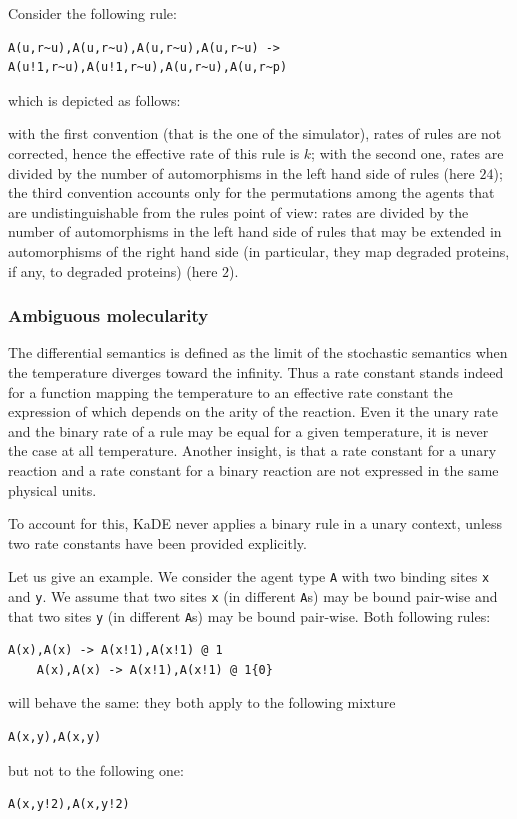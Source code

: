 \documentclass[11pt]{book}
\def\KaDE{\textsf{KaDE}}
\begin{document}
  Consider the following rule:
    \begin{lstlisting}[language=kappa]
      A(u,r~u),A(u,r~u),A(u,r~u),A(u,r~u) -> A(u!1,r~u),A(u!1,r~u),A(u,r~u),A(u,r~p)
    \end{lstlisting}
which is depicted as follows:
\begin{center}
\end{center}

  with the first convention (that is the one of the simulator), rates of rules are not corrected, hence the effective rate of this rule is $k$;
  with the second one, rates are divided by the number of automorphisms in the left hand side of rules (here $24$); the third convention accounts only for the permutations among the agents that are undistinguishable from the rules point of view: rates are divided by the number of automorphisms in the left hand side of rules that may be extended in automorphisms of the right hand side (in particular, they map degraded proteins, if any, to degraded proteins) (here $2$).

  \subsubsection{Ambiguous molecularity}

The differential semantics is defined as the limit of the stochastic semantics when the temperature diverges toward the infinity. Thus a rate constant stands indeed for a function mapping the temperature to an effective rate constant the expression of which depends on the arity of the reaction. Even it the unary rate and the binary rate of a rule may be equal for a given temperature, it is never the case at all temperature. Another insight, is that a rate constant for a unary reaction and a rate constant for a binary reaction are not expressed in the same physical units.

To account for this, {\KaDE} never applies a binary rule in a
  unary context, unless two rate constants have been provided explicitly.

  Let us give an example. We consider the agent type \texttt{A} with two binding sites \texttt{x} and \texttt{y}. We assume that two sites \texttt{x} (in different \texttt{A}s) may be bound pair-wise and that two sites \texttt{y} (in different \texttt{A}s) may be bound pair-wise. Both following rules:
  \begin{lstlisting}[language=kappa]
    A(x),A(x) -> A(x!1),A(x!1) @ 1
    A(x),A(x) -> A(x!1),A(x!1) @ 1{0}
  \end{lstlisting}
  will behave the same: they both apply to the following mixture
  \begin{lstlisting}[language=kappa]
    A(x,y),A(x,y)
  \end{lstlisting}
  but not to the following one:
  \begin{lstlisting}[language=kappa]
    A(x,y!2),A(x,y!2)
  \end{lstlisting}
\end{document}
